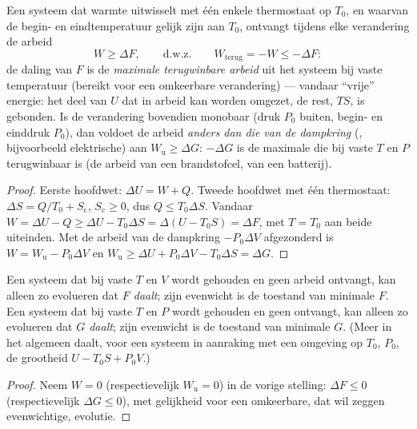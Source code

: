 \begin{theorem}\label{thm:b2:thermodynamic-potentials:monothermal}
Een systeem dat warmte uitwisselt met één enkele thermostaat op $T_0$, en waarvan
de begin- en eindtemperatuur gelijk zijn aan $T_0$, ontvangt tijdens elke
verandering de arbeid
\[
W \ge \Delta F , \qquad\text{d.w.z.}\qquad W_{\text{terug}} = -W \le -\Delta F :
\]
de daling van $F$ is de \emph{maximale terugwinbare arbeid} uit het
systeem bij vaste temperatuur (bereikt voor een omkeerbare verandering) ---
vandaar ``vrije'' energie: het deel van $U$ dat in arbeid kan worden omgezet, de
rest, $TS$, is gebonden. Is de verandering bovendien monobaar
(druk $P_0$ buiten, begin- en einddruk $P_0$), dan voldoet de arbeid
\emph{anders dan die van de dampkring} (, bijvoorbeeld elektrische)
aan $W_{\text{u}} \ge \Delta G$: $-\Delta G$ is de maximale  die
bij vaste $T$ en $P$ terugwinbaar is (de arbeid van een brandstofcel, van een
batterij).
\end{theorem}

\begin{proof}
Eerste hoofdwet: $\Delta U = W + Q$. Tweede hoofdwet met één thermostaat:
$\Delta S
= Q/T_0 + S_{\text{c}}$, $S_{\text{c}} \ge 0$, dus
$Q \le T_0\Delta S$. Vandaar
$W = \Delta U - Q \ge \Delta U - T_0\Delta S = \Delta(U - T_0S) = \Delta F$, met
$T = T_0$ aan beide uiteinden. Met de arbeid van de dampkring $-P_0\Delta V$
afgezonderd is $W = W_{\text{u}} - P_0\Delta V$ en
$W_{\text{u}} \ge \Delta U + P_0
\Delta V - T_0\Delta S = \Delta G$.
\end{proof}

\begin{theorem}\label{thm:b2:thermodynamic-potentials:criteria}
Een systeem dat bij vaste $T$ en $V$ wordt gehouden en geen arbeid ontvangt,
kan alleen
zo evolueren dat \emph{$F$ daalt}; zijn evenwicht is de toestand van
minimale $F$. Een systeem dat bij vaste $T$ en $P$ wordt gehouden en geen  ontvangt, kan alleen zo evolueren dat \emph{$G$ daalt}; zijn evenwicht is
de toestand van minimale $G$. (Meer in het algemeen daalt, voor een systeem
in aanraking
met een omgeving op $T_0$, $P_0$, de grootheid $U - T_0S + P_0V$.)
\end{theorem}

\begin{proof}
Neem $W = 0$ (respectievelijk $W_{\text{u}} = 0$) in de vorige stelling:
$\Delta F
\le 0$ (respectievelijk $\Delta G \le 0$), met gelijkheid voor een
omkeerbare, dat wil zeggen
evenwichtige, evolutie.
\end{proof}

